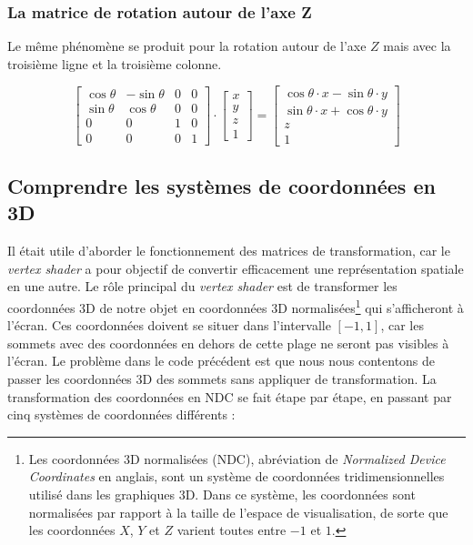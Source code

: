 \subsubsection*{La matrice de rotation autour de l'axe Z}
Le même phénomène se produit pour la rotation autour de l'axe $Z$ mais avec la troisième ligne et la troisième colonne.

\[
\begin{bmatrix}
\cos{\theta} & -\sin{\theta} & 0 & 0\\
\sin{\theta} &  \cos{\theta} & 0 & 0\\
0 & 0 & 1 & 0\\
0 & 0 & 0 & 1
\end{bmatrix}
\cdot
\begin{bmatrix}
x\\
y\\
z\\
1
\end{bmatrix}
=
\begin{bmatrix}
\cos{\theta} \cdot x - \sin{\theta} \cdot y\\
\sin{\theta} \cdot x + \cos{\theta} \cdot y\\
z\\
1
\end{bmatrix}
\]

\subsection*{Comprendre les systèmes de coordonnées en 3D}

Il était utile d'aborder le fonctionnement des matrices de transformation, car le \textit{vertex shader} a pour objectif de convertir efficacement une représentation spatiale en une autre. Le rôle principal du \textit{vertex shader} est de transformer les coordonnées 3D de notre objet en coordonnées 3D normalisées\footnote{Les coordonnées 3D normalisées (NDC), abréviation de \textit{Normalized Device Coordinates} en anglais, sont un système de coordonnées tridimensionnelles utilisé dans les graphiques 3D. Dans ce système, les coordonnées sont normalisées par rapport à la taille de l'espace de visualisation, de sorte que les coordonnées $X$, $Y$ et $Z$ varient toutes entre $-1$ et $1$.} qui s'afficheront à l'écran. Ces coordonnées doivent se situer dans l'intervalle $[-1, 1]$, car les sommets avec des coordonnées en dehors de cette plage ne seront pas visibles à l'écran. Le problème dans le code précédent est que nous nous contentons de passer les coordonnées 3D des sommets sans appliquer de transformation. La transformation des coordonnées en NDC se fait étape par étape, en passant par cinq systèmes de coordonnées différents :

